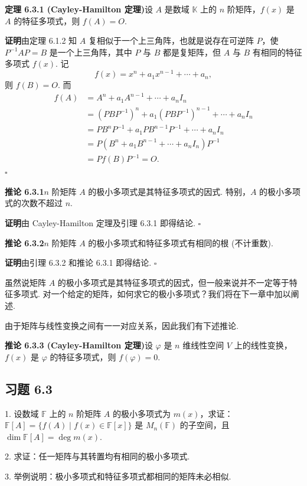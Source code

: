\documentclass[UTF8, 12pt, fontset=fandol, oneside]{ctexart}
\begin{document}
\noindent\textbf{定理 6.3.1 (Cayley-Hamilton 定理)}\quad 设 $A$ 是数域 $\mathbb{K}$ 上的 $n$ 阶矩阵，$f(x)$ 是 $A$ 的特征多项式，则 $f(A)=O$.

\noindent\textbf{证明}\quad 由定理 6.1.2 知 $A$ 复相似于一个上三角阵，也就是说存在可逆阵 $P$，使 $P^{-1}AP=B$ 是一个上三角阵，其中 $P$ 与 $B$ 都是复矩阵，但 $A$ 与 $B$ 有相同的特征多项式 $f(x)$. 记
\[
f(x)=x^n+a_1x^{n-1}+\cdots+a_n,
\]
则 $f(B)=O$. 而
\[
\begin{aligned}
f(A)&=A^n+a_1A^{n-1}+\cdots+a_nI_n\\
&=(PBP^{-1})^n+a_1(PBP^{-1})^{n-1}+\cdots+a_nI_n\\
&=PB^nP^{-1}+a_1PB^{n-1}P^{-1}+\cdots+a_nI_n\\
&=P(B^n+a_1B^{n-1}+\cdots+a_nI_n)P^{-1}\\
&=Pf(B)P^{-1}=O.
\end{aligned}
\]
$\square$

\noindent\textbf{推论 6.3.1}\quad $n$ 阶矩阵 $A$ 的极小多项式是其特征多项式的因式. 特别，$A$ 的极小多项式的次数不超过 $n$.

\noindent\textbf{证明}\quad 由 Cayley-Hamilton 定理及引理 6.3.1 即得结论. $\square$

\noindent\textbf{推论 6.3.2}\quad $n$ 阶矩阵 $A$ 的极小多项式和特征多项式有相同的根 (不计重数).

\noindent\textbf{证明}\quad 由引理 6.3.2 和推论 6.3.1 即得结论. $\square$

虽然说矩阵 $A$ 的极小多项式是其特征多项式的因式，但一般来说并不一定等于特征多项式. 对一个给定的矩阵，如何求它的极小多项式？我们将在下一章中加以阐述.

由于矩阵与线性变换之间有一一对应关系，因此我们有下述推论.

\noindent\textbf{推论 6.3.3 (Cayley-Hamilton 定理)}\quad 设 $\varphi$ 是 $n$ 维线性空间 $V$ 上的线性变换，$f(x)$ 是 $\varphi$ 的特征多项式，则 $f(\varphi)=0$.

\subsection*{习题 6.3}

1. 设数域 $\mathbb{F}$ 上的 $n$ 阶矩阵 $A$ 的极小多项式为 $m(x)$，求证：$\mathbb{F}[A]=\{f(A)\mid f(x)\in\mathbb{F}[x]\}$ 是 $M_n(\mathbb{F})$ 的子空间，且 $\dim\mathbb{F}[A]=\deg m(x)$.

2. 求证：任一矩阵与其转置均有相同的极小多项式.

3. 举例说明：极小多项式和特征多项式都相同的矩阵未必相似.
\end{document}
